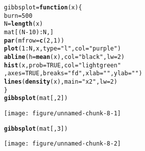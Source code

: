 \documentclass{article}\usepackage[]{graphicx}\usepackage[]{color}
\makeatletter
\def\maxwidth{ %
  \ifdim\Gin@nat@width>\linewidth
    \linewidth
  \else
    \Gin@nat@width
  \fi
}
\newcommand{\hlnum}[1]{\textcolor[rgb]{0.686,0.059,0.569}{#1}}%
\newcommand{\hlstr}[1]{\textcolor[rgb]{0.192,0.494,0.8}{#1}}%
\newcommand{\hlopt}[1]{\textcolor[rgb]{0,0,0}{#1}}%
\newcommand{\hlstd}[1]{\textcolor[rgb]{0.345,0.345,0.345}{#1}}%
\newcommand{\hlkwa}[1]{\textcolor[rgb]{0.161,0.373,0.58}{\textbf{#1}}}%
\newcommand{\hlkwb}[1]{\textcolor[rgb]{0.69,0.353,0.396}{#1}}%
\newcommand{\hlkwc}[1]{\textcolor[rgb]{0.333,0.667,0.333}{#1}}%
\newcommand{\hlkwd}[1]{\textcolor[rgb]{0.737,0.353,0.396}{\textbf{#1}}}%
\newenvironment{kframe}{%
 \def\at@end@of@kframe{}%
 \ifinner\ifhmode%
  \def\at@end@of@kframe{\end{minipage}}%
  \begin{minipage}{\columnwidth}%
 \fi\fi%
 \def\FrameCommand##1{\hskip\@totalleftmargin \hskip-\fboxsep
 \colorbox{shadecolor}{##1}\hskip-\fboxsep
     \hskip-\linewidth \hskip-\@totalleftmargin \hskip\columnwidth}%
 \MakeFramed {\advance\hsize-\width
   \@totalleftmargin\z@ \linewidth\hsize
   \@setminipage}}%
 {\par\unskip\endMakeFramed%
 \at@end@of@kframe}
\newenvironment{knitrout}{}{} %
\makeatother
\begin{document}
\begin{knitrout}
\begin{kframe}
\begin{alltt}
  \hlstd{gibbsplot}\hlkwb{=}\hlkwa{function}\hlstd{(}\hlkwc{x}\hlstd{)\{}
    \hlstd{burn}\hlkwb{=}\hlnum{500}
    \hlstd{N}\hlkwb{=}\hlkwd{length}\hlstd{(x)}
    \hlstd{mat[(N}\hlopt{-}\hlnum{10}\hlstd{)}\hlopt{:}\hlstd{N,]}
    \hlkwd{par}\hlstd{(}\hlkwc{mfrow}\hlstd{=}\hlkwd{c}\hlstd{(}\hlnum{2}\hlstd{,}\hlnum{1}\hlstd{))}
    \hlkwd{plot}\hlstd{(}\hlnum{1}\hlopt{:}\hlstd{N,x,} \hlkwc{type}\hlstd{=}\hlstr{"l"}\hlstd{,} \hlkwc{col}\hlstd{=}\hlstr{"purple"}\hlstd{)}
    \hlkwd{abline}\hlstd{(}\hlkwc{h}\hlstd{=}\hlkwd{mean}\hlstd{(x),}\hlkwc{col}\hlstd{=}\hlstr{"black"}\hlstd{,}\hlkwc{lw}\hlstd{=}\hlnum{2}\hlstd{)}
    \hlkwd{hist}\hlstd{(x,}\hlkwc{prob}\hlstd{=}\hlnum{TRUE}\hlstd{,}\hlkwc{col}\hlstd{=}\hlstr{"lightgreen"}
         \hlstd{,}\hlkwc{axes}\hlstd{=}\hlnum{TRUE}\hlstd{,}\hlkwc{breaks} \hlstd{=} \hlstr{"fd"}\hlstd{,}\hlkwc{xlab}\hlstd{=}\hlstr{""}\hlstd{,}\hlkwc{ylab}\hlstd{=}\hlstr{""}\hlstd{)}
    \hlkwd{lines}\hlstd{(}\hlkwd{density}\hlstd{(x),}\hlkwc{main}\hlstd{=}\hlstr{"x2"}\hlstd{,}\hlkwc{lw}\hlstd{=}\hlnum{2}\hlstd{)}
  \hlstd{\}}
  \hlkwd{gibbsplot}\hlstd{(mat[,}\hlnum{2}\hlstd{])}
\end{alltt}
\end{kframe}
\texttt{[image: figure/unnamed-chunk-8-1]} 
\begin{kframe}\begin{alltt}
  \hlkwd{gibbsplot}\hlstd{(mat[,}\hlnum{3}\hlstd{])}
\end{alltt}
\end{kframe}
\texttt{[image: figure/unnamed-chunk-8-2]} 

\end{knitrout}
\end{document}
